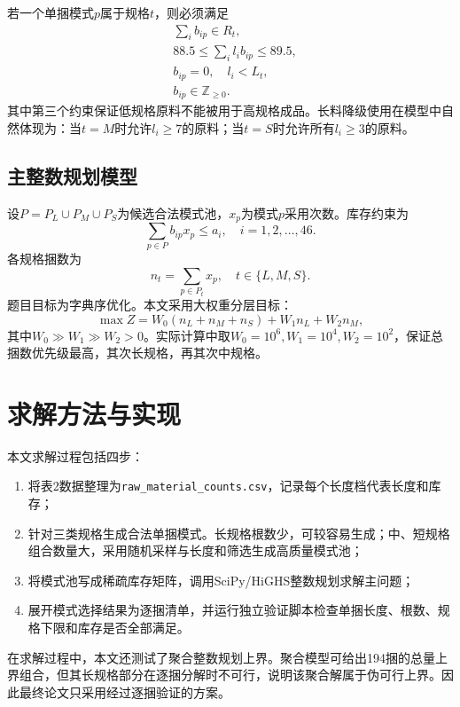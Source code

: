 \documentclass[UTF8,a4paper,12pt]{ctexart}
\begin{document}
若一个单捆模式$p$属于规格$t$，则必须满足
\begin{align}
&\sum_i b_{ip}\in R_t,\\
&88.5\leq \sum_i l_i b_{ip}\leq 89.5,\\
&b_{ip}=0,\quad l_i<L_t,\\
&b_{ip}\in\mathbb{Z}_{\geq0}.
\end{align}
其中第三个约束保证低规格原料不能被用于高规格成品。长料降级使用在模型中自然体现为：当$t=M$时允许$l_i\geq7$的原料；当$t=S$时允许所有$l_i\geq3$的原料。

\subsection{主整数规划模型}
设$P=P_L\cup P_M\cup P_S$为候选合法模式池，$x_p$为模式$p$采用次数。库存约束为
\begin{equation}
\sum_{p\in P}b_{ip}x_p\leq a_i,\quad i=1,2,\ldots,46.
\end{equation}
各规格捆数为
\begin{equation}
n_t=\sum_{p\in P_t}x_p,\quad t\in\{L,M,S\}.
\end{equation}
题目目标为字典序优化。本文采用大权重分层目标：
\begin{equation}
\max Z=W_0(n_L+n_M+n_S)+W_1n_L+W_2n_M,
\end{equation}
其中$W_0\gg W_1\gg W_2>0$。实际计算中取$W_0=10^6,W_1=10^4,W_2=10^2$，保证总捆数优先级最高，其次长规格，再其次中规格。

\section{求解方法与实现}
本文求解过程包括四步：
\begin{enumerate}[label=\arabic*)]
  \item 将表2数据整理为\texttt{raw\_material\_counts.csv}，记录每个长度档代表长度和库存；
  \item 针对三类规格生成合法单捆模式。长规格根数少，可较容易生成；中、短规格组合数量大，采用随机采样与长度和筛选生成高质量模式池；
  \item 将模式池写成稀疏库存矩阵，调用SciPy/HiGHS整数规划求解主问题；
  \item 展开模式选择结果为逐捆清单，并运行独立验证脚本检查单捆长度、根数、规格下限和库存是否全部满足。
\end{enumerate}

在求解过程中，本文还测试了聚合整数规划上界。聚合模型可给出194捆的总量上界组合，但其长规格部分在逐捆分解时不可行，说明该聚合解属于伪可行上界。因此最终论文只采用经过逐捆验证的方案。
\end{document}
